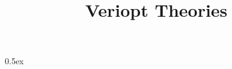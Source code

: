 \documentclass[11pt,a4paper]{article}
\begin{document}
\title{Veriopt Theories}
\maketitle

\tableofcontents

\parindent 0pt\parskip 0.5ex



%
%
\end{document}
